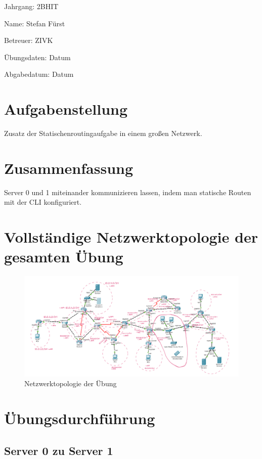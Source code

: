 \documentclass[a4paper]{article}
\begin{document}
Jahrgang:	2BHIT

Name:	Stefan Fürst

Betreuer: 	ZIVK

Übungsdaten:	Datum

Abgabedatum:	Datum


\newpage
\tableofcontents

\newpage

\section{Aufgabenstellung}
Zusatz der Statischenroutingaufgabe in einem großen Netzwerk.
\section{Zusammenfassung}
Server 0 und 1 miteinander kommunizieren lassen, indem man statische Routen mit der CLI konfiguriert.


\newpage

\section{Vollständige Netzwerktopologie der gesamten Übung}

\begin{figure}[h]
	\includegraphics[scale=0.5]{topologie.png}
	\caption{Netzwerktopologie der Übung}
\end{figure}

\newpage

\section{Übungsdurchführung}
\subsection{Server 0 zu Server 1}
\end{document}
